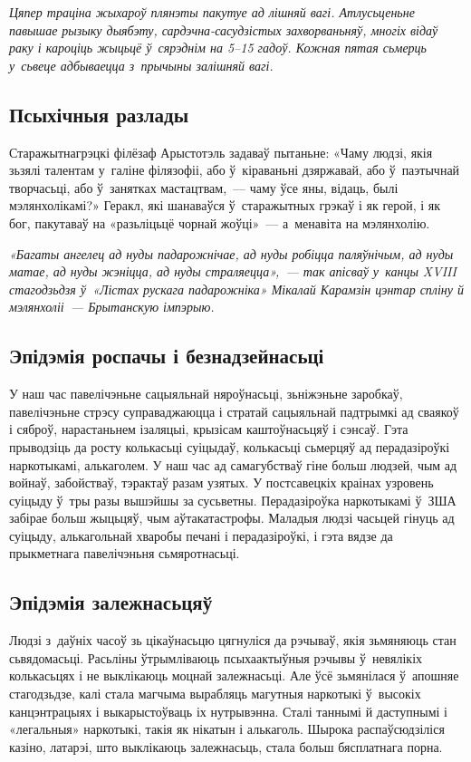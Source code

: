\emph{Цяпер траціна жыхароў плянэты пакутуе ад лішняй вагі. Атлусьценьне павышае рызыку дыябэту, сардэчна-сасудзістых захворваньняў, многіх відаў раку і кароціць жыцьцё ў~сярэднім на 5--15 гадоў. Кожная пятая сьмерць у~сьвеце адбываецца з~прычыны залішняй вагі.}

\subsection*{Псыхічныя разлады}

Старажытнагрэцкі філёзаф Арыстотэль задаваў пытаньне: «Чаму людзі, якія зьзялі талентам у~галіне філязофіі, або ў~кіраваньні дзяржавай, або ў~паэтычнай творчасьці, або ў~занятках мастацтвам,~--- чаму ўсе яны, відаць, былі мэлянхолікамі?» Геракл, які шанаваўся ў~старажытных грэкаў і як герой, і як бог, пакутаваў на «разьліцьцё чорнай жоўці»~--- а~менавіта на мэлянхолію.

\emph{«Багаты ангелец ад нуды падарожнічае, ад нуды робіцца паляўнічым, ад нуды матае, ад нуды жэніцца, ад нуды страляецца»,~--- так апісваў у~канцы XVIII стагодзьдзя ў~«Лістах рускага падарожніка» Мікалай Карамзін цэнтар спліну й мэлянхоліі~--- Брытанскую імпэрыю.}

\subsection*{Эпідэмія роспачы і безнадзейнасьці} 

У наш час павелічэньне сацыяльнай няроўнасьці, зьніжэньне заробкаў, павелічэньне стрэсу суправаджаюцца і стратай сацыяльнай падтрымкі ад сваякоў і сяброў, нарастаньнем ізаляцыі, крызісам каштоўнасьцяў і сэнсаў. Гэта прыводзіць да росту колькасьці суіцыдаў, колькасьці сьмерцяў ад перадазіроўкі наркотыкамі, алькаголем. У наш час ад самагубстваў гіне больш людзей, чым ад войнаў, забойстваў, тэрактаў разам узятых. У постсавецкіх краінах узровень суіцыду ў~тры разы вышэйшы за сусьветны. Перадазіроўка наркотыкамі ў~ЗША забірае больш жыцьцяў, чым аўтакатастрофы. Маладыя людзі часьцей гінуць ад суіцыду, алькагольнай хваробы печані і перадазіроўкі, і гэта вядзе да прыкметнага павелічэньня сьмяротнасьці.

\subsection*{Эпідэмія залежнасьцяў} 

Людзі з~даўніх часоў зь цікаўнасьцю цягнуліся да рэчываў, якія зьмяняюць стан сьвядомасьці. Расьліны ўтрымліваюць псыхаактыўныя рэчывы ў~невялікіх колькасьцях і не выклікаюць моцнай залежнасьці. Але ўсё зьмянілася ў~апошняе стагодзьдзе, калі стала магчыма вырабляць магутныя наркотыкі ў~высокіх канцэнтрацыях і выкарыстоўваць іх нутрывэнна. Сталі таннымі й даступнымі і «легальныя» наркотыкі, такія як нікатын і алькаголь. Шырока распаўсюдзіліся казіно, латарэі, што выклікаюць залежнасьць, стала больш бясплатнага порна.

